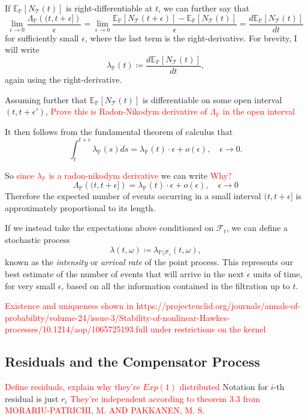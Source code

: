 \documentclass[honours,12pt]{unswthesis}
\numberwithin{equation}{section}
\begin{document}
If $\mathbb{E}_\mathbb{P}\left[N_\mathcal{T}(t)\right]$ is right-differentiable at $t$, we can further say that
$$\lim_{\epsilon\to0}\frac{\Lambda_\mathbb{P}\left((t,t+\epsilon]\right)}{\epsilon} = \lim_{\epsilon\to0}\frac{\mathbb{E}_\mathbb{P}\left[N_\mathcal{T}(t+\epsilon)\right] - \mathbb{E}_\mathbb{P}\left[N_\mathcal{T}(t)\right]}{\epsilon} = \frac{d\mathbb{E}_\mathbb{P}\left[N_\mathcal{T}(t)\right]}{dt}$$
for sufficiently small $\epsilon$, where the last term is the right-derivative. For brevity, I will write
$$\lambda_{\mathbb{P}}(t) \coloneq \frac{d\mathbb{E}_\mathbb{P}\left[N_\mathcal{T}(t)\right]}{dt},$$
again using the right-derivative.

Assuming further that $\mathbb{E}_\mathbb{P}\left[N_\mathcal{T}(t)\right]$ is differentiable on some open interval $(t,t+\epsilon')$, \textcolor{red}{Prove this is Radon-Nikodym derivative of $\Lambda_\mathbb{P}$ in the open interval}

It then follows from the fundamental theorem of calculus that
$$\int_t^{t+\epsilon} \lambda_{\mathbb{P}}(s)ds = \lambda_{\mathbb{P}}(t)\cdot\epsilon + o(\epsilon),\quad \epsilon\to 0.$$

So \textcolor{red}{since $\lambda_\mathbb{P}$ is a radon-nikodym derivative} we can write \textcolor{red}{Why?}
$$\Lambda_{\mathbb{P}}\left((t,t+\epsilon]\right)=\lambda_{\mathbb{P}}(t)\cdot\epsilon+o(\epsilon),\quad \epsilon\to 0$$
Therefore the expected number of events occurring in a small interval $(t,t+\epsilon]$ is approximately proportional to its length.

If we instead take the expectations above conditioned on $\mathcal{F}_t$, we can define a stochastic process
$$\lambda(t,\omega) \coloneq \lambda_{\mathbb{P}\vert\mathcal{F}_t}(t,\omega),$$
known as the \textit{intensity} or \textit{arrival rate} of the point process. This represents our best estimate of the number of events that will arrive in the next $\epsilon$ units of time, for very small $\epsilon$, based on all the information contained in the filtration up to $t$.

\textcolor{red}{Existence and uniqueness shown in https://projecteuclid.org/journals/annals-of-probability/volume-24/issue-3/Stability-of-nonlinear-Hawkes-processes/10.1214/aop/1065725193.full under restrictions on the kernel}

\subsection{Residuals and the Compensator Process}
\textcolor{red}{Define residuals, explain why they're $Exp(1)$ distributed}
Notation for $i$-th residual is just $r_i$
\textcolor{red}{They're independent according to theorem 3.3 from MORARIU-PATRICHI, M. AND PAKKANEN, M. S.}
\end{document}
